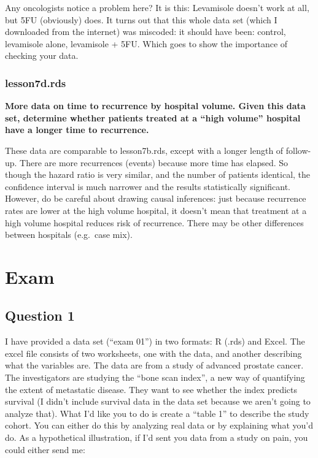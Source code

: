 \documentclass[]{book}
\begin{document}
Any oncologists notice a problem here? It is this: Levamisole doesn't
work at all, but 5FU (obviously) does. It turns out that this whole data
set (which I downloaded from the internet) was miscoded: it should have
been: control, levamisole alone, levamisole + 5FU. Which goes to show
the importance of checking your data.

\hypertarget{lesson7d.rds}{%
\subsection{lesson7d.rds}\label{lesson7d.rds}}

\textbf{More data on time to recurrence by hospital volume. Given this
data set, determine whether patients treated at a ``high volume''
hospital have a longer time to recurrence.}

These data are comparable to lesson7b.rds, except with a longer length
of follow-up. There are more recurrences (events) because more time has
elapsed. So though the hazard ratio is very similar, and the number of
patients identical, the confidence interval is much narrower and the
results statistically significant. However, do be careful about drawing
causal inferences: just because recurrence rates are lower at the high
volume hospital, it doesn't mean that treatment at a high volume
hospital reduces risk of recurrence. There may be other differences
between hospitals (e.g.~case mix).

\hypertarget{exam}{%
\chapter{Exam}\label{exam}}

\hypertarget{question-1}{%
\section{Question 1}\label{question-1}}

I have provided a data set (``exam 01'') in two formats: R (.rds) and
Excel. The excel file consists of two worksheets, one with the data, and
another describing what the variables are. The data are from a study of
advanced prostate cancer. The investigators are studying the ``bone scan
index'', a new way of quantifying the extent of metastatic disease. They
want to see whether the index predicts survival (I didn't include
survival data in the data set because we aren't going to analyze that).
What I'd like you to do is create a ``table 1'' to describe the study
cohort. You can either do this by analyzing real data or by explaining
what you'd do. As a hypothetical illustration, if I'd sent you data from
a study on pain, you could either send me:
\end{document}
